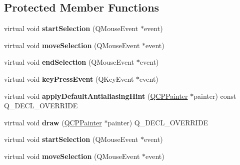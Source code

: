 \subsection*{Protected Member Functions}
\begin{DoxyCompactItemize}
\item 
\mbox{\label{class_q_c_p_selection_rect_a271f24cfca8bc50a0e2b4310ff90e227}} 
virtual void {\bfseries start\+Selection} (Q\+Mouse\+Event $\ast$event)
\item 
\mbox{\label{class_q_c_p_selection_rect_a95c3f1700be2a6d7bba0fe56ece5fbb1}} 
virtual void {\bfseries move\+Selection} (Q\+Mouse\+Event $\ast$event)
\item 
\mbox{\label{class_q_c_p_selection_rect_a625bcffd73987f6de6c6559aaf29ab9d}} 
virtual void {\bfseries end\+Selection} (Q\+Mouse\+Event $\ast$event)
\item 
\mbox{\label{class_q_c_p_selection_rect_a1affe764316d6122a26fdb2e9583feb1}} 
virtual void {\bfseries key\+Press\+Event} (Q\+Key\+Event $\ast$event)
\item 
\mbox{\label{class_q_c_p_selection_rect_aa854697618e16037ba9c73056abfb9bf}} 
virtual void {\bfseries apply\+Default\+Antialiasing\+Hint} (\hyperlink{class_q_c_p_painter}{Q\+C\+P\+Painter} $\ast$painter) const Q\+\_\+\+D\+E\+C\+L\+\_\+\+O\+V\+E\+R\+R\+I\+DE
\item 
\mbox{\label{class_q_c_p_selection_rect_ab0e50ae796508bdcd97ab8c335c593bf}} 
virtual void {\bfseries draw} (\hyperlink{class_q_c_p_painter}{Q\+C\+P\+Painter} $\ast$painter) Q\+\_\+\+D\+E\+C\+L\+\_\+\+O\+V\+E\+R\+R\+I\+DE
\item 
\mbox{\label{class_q_c_p_selection_rect_a3d1b0ef1fb16ecd130921d80cb022479}} 
virtual void {\bfseries start\+Selection} (Q\+Mouse\+Event $\ast$event)
\item 
\mbox{\label{class_q_c_p_selection_rect_a651e9aa1e98455b19904ca72854a39d5}} 
virtual void {\bfseries move\+Selection} (Q\+Mouse\+Event $\ast$event)

\end{DoxyCompactItemize}
